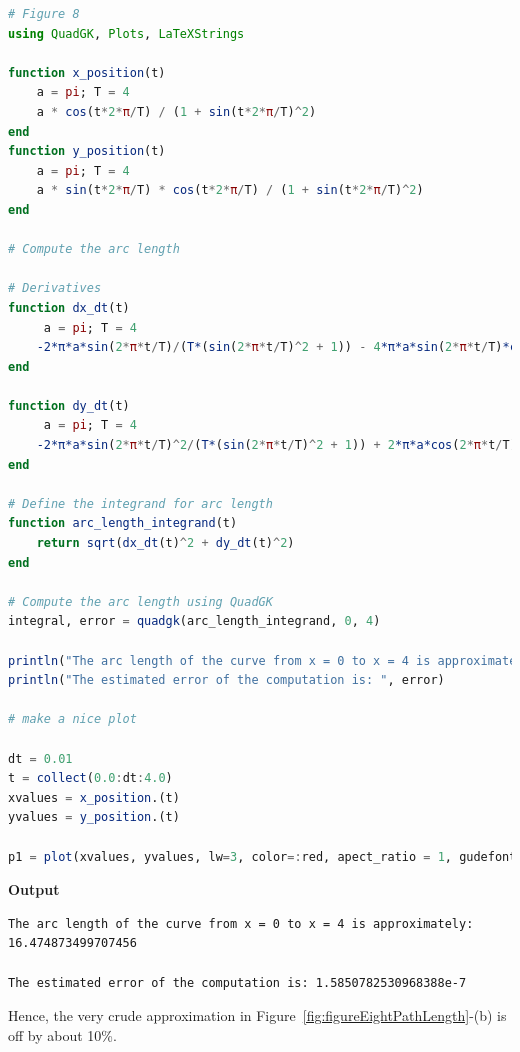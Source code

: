 \begin{lstlisting}[language=Julia,style=mystyle]
# Figure 8 
using QuadGK, Plots, LaTeXStrings

function x_position(t)
    a = pi; T = 4
    a * cos(t*2*π/T) / (1 + sin(t*2*π/T)^2)
end
function y_position(t)
    a = pi; T = 4
    a * sin(t*2*π/T) * cos(t*2*π/T) / (1 + sin(t*2*π/T)^2)
end

# Compute the arc length

# Derivatives
function dx_dt(t)
     a = pi; T = 4
    -2*π*a*sin(2*π*t/T)/(T*(sin(2*π*t/T)^2 + 1)) - 4*π*a*sin(2*π*t/T)*cos(2*π*t/T)^2/(T*(sin(2*π*t/T)^2 + 1)^2)
end

function dy_dt(t)
     a = pi; T = 4
    -2*π*a*sin(2*π*t/T)^2/(T*(sin(2*π*t/T)^2 + 1)) + 2*π*a*cos(2*π*t/T)^2/(T*(sin(2*π*t/T)^2 + 1)) - 4*π*a*sin(2*π*t/T)^2*cos(2*π*t/T)^2/(T*(sin(2*π*t/T)^2 + 1)^2)
end

# Define the integrand for arc length
function arc_length_integrand(t)
    return sqrt(dx_dt(t)^2 + dy_dt(t)^2)
end

# Compute the arc length using QuadGK
integral, error = quadgk(arc_length_integrand, 0, 4)

println("The arc length of the curve from x = 0 to x = 4 is approximately: ", integral)
println("The estimated error of the computation is: ", error)

# make a nice plot

dt = 0.01
t = collect(0.0:dt:4.0)
xvalues = x_position.(t)
yvalues = y_position.(t)

p1 = plot(xvalues, yvalues, lw=3, color=:red, apect_ratio = 1, gudefont = 15, label=false)
\end{lstlisting}
\textbf{Output} 
\begin{verbatim}
The arc length of the curve from x = 0 to x = 4 is approximately: 16.474873499707456

The estimated error of the computation is: 1.5850782530968388e-7
\end{verbatim}
Hence, the very crude approximation in Figure~\ref{fig:figureEightPathLength}-(b) is off by about 10\%. 
\Qed

\bigskip


